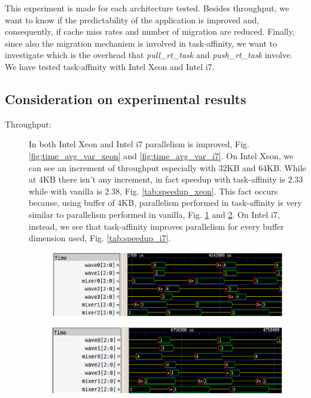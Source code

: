 This experiment is made for each architecture tested. Besides throughput, we want to know if the predictability of the application is improved and, 
consequently, if cache miss rates and number of migration are reduced. Finally, since also the migration mechanism is involved in task-affinity, we want 
to investigate which is the overhead that \textit{pull\_rt\_task} and \textit{push\_rt\_task} involve. We have tested task-affinity with Intel Xeon and 
Intel i7.

\subsection{Consideration on experimental results}

\begin{description}

\item[Throughput:] In both Intel Xeon and Intel i7 parallelism is improved, Fig. \ref{fig:time_avg_var_xeon} and \ref{fig:time_avg_var_i7}. On Intel Xeon, 
we can see an increment of throughput especially with 32KB and 64KB. While at 4KB there isn't any increment, in fact speedup with task-affinity is $2.33$ 
while with vanilla is $2.38$, Fig. \ref{tab:speedup_xeon}. This fact occurs because, using buffer of 4KB, parallelism performed in task-affinity is very 
similar to parallelism performed in vanilla, Fig. \ref{fig:4KB_xeon_results_taskaff} and \ref{fig:4KB_xeon_results_van}. On Intel i7, instead, we see that 
task-affinity improves parallelism for every buffer dimension used, Fig. \ref{tab:speedup_i7}.

\begin{figure}[htbp]
\centering
\includegraphics[width=\widefigure]{images/results_xeon/4KB_results_xeon_taskaff.eps}
\caption{}
\label{fig:4KB_xeon_results_taskaff}
\end{figure}

\begin{figure}[htbp]
\centering
\includegraphics[width=\widefigure]{images/results_xeon/4KB_results_xeon_van.eps}
\caption{}
\label{fig:4KB_xeon_results_van}
\end{figure}


\end{description}
